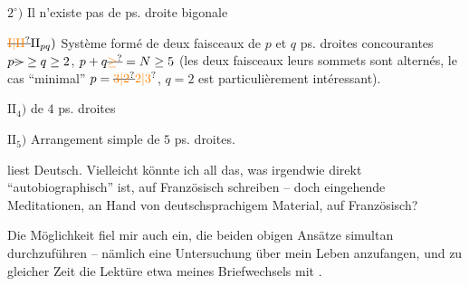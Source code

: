 $2^\circ)$ Il n'existe pas de ps. droite bigonale 

$\deleted{\unsure{\mathrm I|\mathrm{II}}}\mathrm{II}_{pq})$ Système formé de deux faisceaux de $p$ et $q$ ps. droites concourantes $p\deleted{>}\geq q\geq2$, $p+q\deleted{\unsure{\geq}}=N\geq5$ (les deux faisceaux  leurs sommets sont  alternés,  le cas ``minimal'' $p=\deleted{\unsure{3|2}}\unsure{2|3}$, $q=2$ est particulièrement intéressant\deleted{\unsure{)}}).

$\mathrm{II}_{4})$   de $4$ ps. droites

$\mathrm{II}_{5})$ Arrangement simple de $5$ ps. droites.

liest Deutsch. Vielleicht könnte ich all das, was irgendwie direkt ``autobiographisch'' ist, auf Französisch schreiben -- doch eingehende Meditationen,  an Hand von deutschsprachigem Material, auf Französisch?

Die Möglichkeit fiel mir auch ein, die beiden obigen Ansätze simultan durchzuführen -- nämlich eine  Untersuchung über mein Leben  anzufangen, und zu gleicher Zeit die Lektüre etwa meines Briefwechsels mit .

